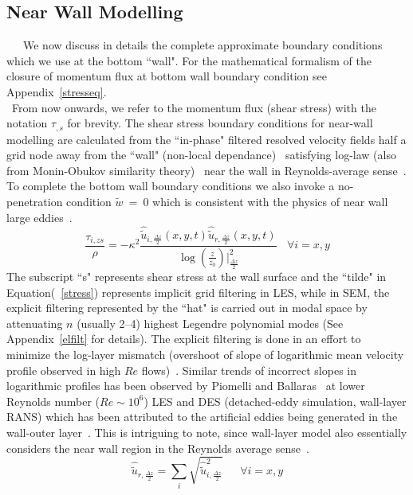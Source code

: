 \subsection{Near Wall Modelling}\label{nwm}
\par
\ \ \ We now discuss in details the complete approximate boundary conditions which we use at the bottom ``wall". For the mathematical formalism of the closure of momentum flux at bottom wall boundary condition see Appendix~\ref{stresseq}.\\
\  From now onwards, we refer to the momentum flux (shear stress) with the notation $\tau_{,s}$ for brevity. The shear stress boundary conditions for near-wall modelling are calculated from the ``in-phase" filtered resolved velocity fields half a grid node away from the ``wall" (non-local dependance)~\cite{bers} satisfying log-law (also from Monin-Obukov similarity theory)~\cite{obu} near the wall in Reynolds-average sense~\cite{pio2,jimtech,lars}. To complete the bottom wall boundary conditions we also invoke a no-penetration condition $\widetilde{w} \ = \ 0$ which is consistent with the physics of near wall large eddies~\cite{maxwell,porte1fun,bers}.
\begin{equation}
\frac{\tau_{i,zs}}{\rho} = -\kappa^{2}\frac{\widehat{\widetilde{u}}_{i,\frac{\Delta z}{2}}(x,y,t)\widehat{\widetilde{u}}_{r,\frac{\Delta z}{2}}(x,y,t)}{\log (\frac{z}{z_0})\Big \vert_{\frac{\Delta z}{2}}^{2}} \ \ \ \  \forall i = x,y \label{stress}
\end{equation}
The subscript ``s" represents shear stress at the wall surface and the ``tilde" in Equation(~\ref{stress}) represents implicit grid filtering in LES, while in SEM, the explicit filtering represented by the ``hat" is carried out in modal space by attenuating $n$ (usually 2--4) highest Legendre polynomial modes (See Appendix~\ref{elfilt} for details). The explicit filtering is done in an effort to minimize the log-layer mismatch
(overshoot of slope of logarithmic mean velocity profile observed in high $Re$ flows)~\cite{sull,bou1,chow,brass,meyers2}. 
Similar trends of incorrect slopes in logarithmic profiles has been observed by Piomelli and Ballaras~\cite{pio2} at lower Reynolds number ($Re\sim 10^6$) LES and DES (detached-eddy simulation, wall-layer RANS) which has been attributed to the artificial eddies being generated in the wall-outer layer~\cite{bag2}. This is intriguing to note, since wall-layer model also essentially considers the near wall region in the Reynolds average sense~\cite{pio2,jimtech,lars}.
\begin{equation}
\widehat{\widetilde{u}}_{r,\frac{\Delta z}{2}} = \sum_{i}\sqrt{\widehat{\widetilde{u}}_{i,\frac{\Delta z}{2}}^{2}} \ \ \ \ \ \ \ \forall i = x,y
\end{equation}
